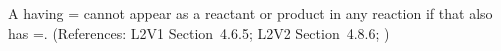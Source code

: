 A \Species having = cannot
appear as a reactant or product in any reaction if that \Species
also has =.  (References: L2V1
Section~4.6.5; L2V2 Section~4.8.6; )
